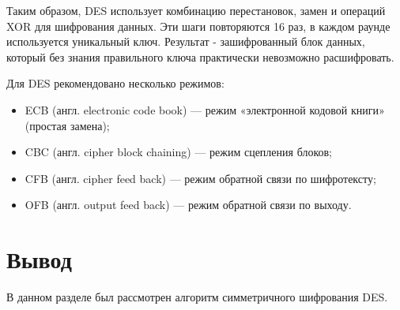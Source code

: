 Таким образом, DES использует комбинацию перестановок, замен и операций XOR для шифрования данных. Эти шаги повторяются 16 раз, в каждом раунде используется уникальный ключ. Результат - зашифрованный блок данных, который без знания правильного ключа практически невозможно расшифровать.

Для DES рекомендовано несколько режимов:

\begin{itemize}
	\item ECB (англ. electronic code book) --- режим «электронной кодовой книги» (простая замена);
	\item CBC (англ. cipher block chaining) --- режим сцепления блоков;
	\item CFB (англ. cipher feed back) --- режим обратной связи по шифротексту;
	\item OFB (англ. output feed back) --- режим обратной связи по выходу.
\end{itemize}

\section*{Вывод}
В данном разделе был рассмотрен алгоритм симметричного шифрования DES.